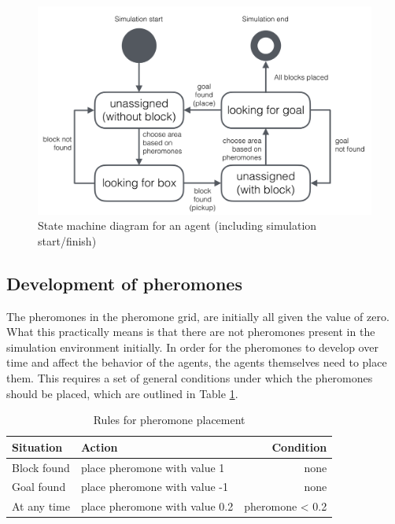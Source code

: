 \begin{figure}[H]
	\centering
	\includegraphics[width=1\columnwidth]{figures/state_machine}
  	\caption{\label{fig:state_machine}State machine diagram for an agent (including simulation start/finish)}
\end{figure}


\subsection{Development of pheromones}
The pheromones in the pheromone grid, are initially all given the value of zero. What this practically means is that there are not pheromones present in the simulation environment initially. In order for the pheromones to develop over time and affect the behavior of the agents, the agents themselves need to place them. This requires a set of general conditions under which the pheromones should be placed, which are outlined in Table \ref{tab:pheromones}.

\begin{table}[H]
\centering
\label{tab:pheromones}
\begin{tabularx}{1\textwidth}{llr}
\toprule
\textbf{Situation}     & \textbf{Action}   & \textbf{Condition}  \\ \hline
Block found & place pheromone with value 1 & none \\
Goal found & place pheromone with value -1 & none \\
At any time & place pheromone with value 0.2 & pheromone < 0.2 \\ \hline
\end{tabularx}
\caption{Rules for pheromone placement}
\end{table}

